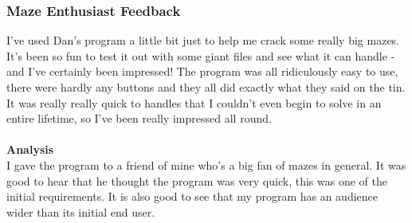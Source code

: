 \documentclass[titlepage]{article}
\begin{document}
\subsubsection{Maze Enthusiast Feedback}
I've used Dan's program a little bit just to help me crack some really big mazes. It's been so fun to test it out with some giant files and see what it can handle - and I've certainly been impressed! The program was all ridiculously easy to use, there were hardly any buttons and they all did exactly what they said on the tin. It was really really quick to handles that I couldn't even begin to solve in an entire lifetime, so I've been really impressed all round.\\\\
\textbf{Analysis}\\
I gave the program to a friend of mine who's a big fan of mazes in general. It was good to hear that he thought the program was very quick, this was one of the initial requirements. It is also good to see that my program has an audience wider than its initial end user. 
\pagebreak
{}
\printbibliography
\end{document}
